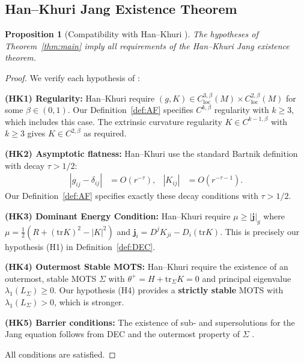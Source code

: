 \documentclass[12pt]{article}
\theoremstyle{plain}
\newtheorem{proposition}[theorem]{Proposition}
\theoremstyle{definition}
\theoremstyle{remark}
\newcommand{\tr}{\mathrm{tr}}
\newcommand{\momdens}{\boldsymbol{j}}
\begin{document}
\subsection{Han--Khuri Jang Existence Theorem}

\begin{proposition}[Compatibility with Han--Khuri {\cite[Theorem~1.1]{hankhuri2013}}]\label{prop:hankhuri-compat}
The hypotheses of Theorem~\ref{thm:main} imply all requirements of the Han--Khuri Jang existence theorem.
\end{proposition}

\begin{proof}
We verify each hypothesis of \cite[Theorem~1.1]{hankhuri2013}:

\textbf{(HK1) Regularity:} Han--Khuri require $(g, K) \in C^{3,\beta}_{\mathrm{loc}}(M) \times C^{2,\beta}_{\mathrm{loc}}(M)$ for some $\beta \in (0,1)$. Our Definition~\ref{def:AF} specifies $C^{k,\beta}$ regularity with $k \geq 3$, which includes this case. The extrinsic curvature regularity $K \in C^{k-1,\beta}$ with $k \geq 3$ gives $K \in C^{2,\beta}$ as required.

\textbf{(HK2) Asymptotic flatness:} Han--Khuri use the standard Bartnik definition \cite{bartnik1986} with decay $\tau > 1/2$:
\begin{align*}
|g_{ij} - \delta_{ij}| &= O(r^{-\tau}), & |K_{ij}| &= O(r^{-\tau-1}).
\end{align*}
Our Definition~\ref{def:AF} specifies exactly these decay conditions with $\tau > 1/2$.

\textbf{(HK3) Dominant Energy Condition:} Han--Khuri require $\mu \geq |\momdens|_g$ where $\mu = \frac{1}{2}(R + (\tr K)^2 - |K|^2)$ and $\momdens_i = D^j K_{ji} - D_i(\tr K)$. This is precisely our hypothesis (H1) in Definition~\ref{def:DEC}.

\textbf{(HK4) Outermost Stable MOTS:} Han--Khuri require the existence of an outermost, stable MOTS $\Sigma$ with $\theta^+ = H + \tr_\Sigma K = 0$ and principal eigenvalue $\lambda_1(L_\Sigma) \geq 0$. Our hypothesis (H4) provides a \textbf{strictly stable} MOTS with $\lambda_1(L_\Sigma) > 0$, which is stronger.

\textbf{(HK5) Barrier conditions:} The existence of sub- and supersolutions for the Jang equation follows from DEC and the outermost property of $\Sigma$ \cite[Proposition~4.1]{hankhuri2013}.

All conditions are satisfied. \qedhere
\end{proof}
\end{document}
